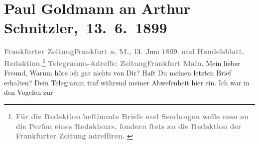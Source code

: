 

         
         \renewcommand{\erwaehntePersonen}{Personen: Richard Beer-Hofmann, Paul Goldmann}
         \renewcommand{\erwaehnteInstitutionen}{Institutionen: Frankfurter Zeitung}
         \renewcommand{\erwaehnteOrte}{Orte: Deutschland, Frankfurt am Main, Frankreich, Italien, Kärnten, Salzburg, Südtirol, Tirol, Vosges, Wien}
         \renewcommand{\erwaehnteWerke}{}
               \section[ Paul Goldmann an Arthur Schnitzler, 13. 6. 1899]{ Paul Goldmann an Arthur Schnitzler, 13. 6. 1899}\nopagebreak{}\rehead{ }\begin{ledgroupsized}[t]{13cm}\normalsize\beginnumbering \toendnotes[C]{\smallbreak\pagebreak[2]} 
\toendnotes[C]{\smallbreak}\pstart
           \noindent{}{\pb}\textcolor{gray}{\textbf{\textbf{Frankfurter Zeitung}}}\hfill \textcolor{gray}{\textbf{\textbf{Frankfurt a. M.,}}}{ }13. Juni \textcolor{gray}{\textbf{189}}9.\pend
           \pstart
           \textcolor{gray}{\textbf{und}}\pend
           \pstart
           \textcolor{gray}{\textbf{Handelsblatt.}}\pend
           \pstart
           \textcolor{gray}{\textbf{\textbf{Redaktion.}\footnote{\noindent{}\textcolor{gray}{\textbf{ Für die Redaktion beſtimmte Briefe und Sendungen wolle man
                                  an die Perſon eines Redakteurs,
                              ſondern ſtets \textbf{an die Redaktion der Frankfurter Zeitung} adreſſiren. }}}}}\pend
           \pstart
           \textcolor{gray}{\textbf{Telegramm-Adreſſe:}}\pend
           \pstart
           \textcolor{gray}{\textbf{\textbf{ZeitungFrankfurt Main.}}}\pend
           \pstart\center{}Mein lieber Freund,\pend\pstart
           Warum höre ich gar nichts von Dir? Haſt Du meinen letzten Brief erhalten?\pend
           \pstart
           Dein Telegramm traf während meiner Abweſenheit hier ein. Ich war in den Vogeſen zur \label{K_L02877-1v}
\end{ledgroupsized}
